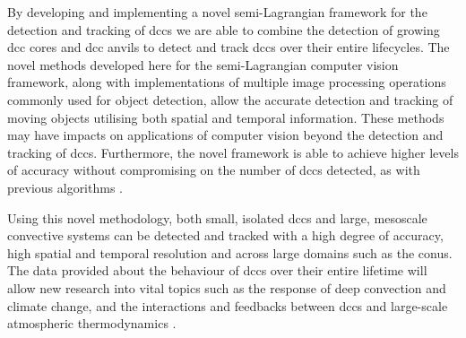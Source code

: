 By developing and implementing a novel semi-Lagrangian framework for the detection and tracking of \acrshort{dcc}s we are able to combine the detection of growing \acrshort{dcc} cores \citep{zinner_cb-tram_2008} and \acrshort{dcc} anvils \citep{muller_role_2018} to detect and track \acrshort{dcc}s over their entire lifecycles.
The novel methods developed here for the semi-Lagrangian computer vision framework, along with implementations of multiple image processing operations commonly used for object detection, allow the accurate detection and tracking of moving objects utilising both spatial and temporal information.
These methods may have impacts on applications of computer vision beyond the detection and tracking of \acrshort{dcc}s.
Furthermore, the novel framework is able to achieve higher levels of accuracy without compromising on the number of \acrshort{dcc}s detected, as with previous algorithms \citep{muller_novel_2019}.

Using this novel methodology, both small, isolated \acrshort{dcc}s and large, mesoscale convective systems can be detected and tracked with a high degree of accuracy, high spatial and temporal resolution and across large domains such as the \acrshort{conus}.
The data provided about the behaviour of \acrshort{dcc}s over their entire lifetime will allow new research into vital topics such as the response of deep convection and climate change, and the interactions and feedbacks between \acrshort{dcc}s and large-scale atmospheric thermodynamics \citep{varble_erroneous_2018}.

